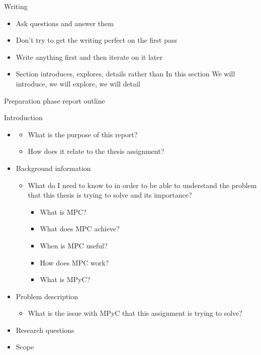 \begin{frame}{Writing}
\protect\hypertarget{writing}{}
\begin{itemize}
\item
  Ask questions and answer them
\item
  Don't try to get the writing perfect on the first pass
\item
  Write anything first and then iterate on it later
\item
  Section introduces, explores, details rather than In this section We
  will introduce, we will explore, we will detail
\end{itemize}
\end{frame}

\begin{frame}{Preparation phase report outline}
\protect\hypertarget{preparation-phase-report-outline}{}
\begin{block}{Introduction}
\protect\hypertarget{introduction}{}
\begin{itemize}
\item
  \begin{itemize}
  \tightlist
  \item
    What is the purpose of this report?
  \item
    How does it relate to the thesis assignment?
  \end{itemize}
\item
  Background information

  \begin{itemize}
  \tightlist
  \item
    What do I need to know to in order to be able to understand the
    problem that this thesis is trying to solve and its importance?

    \begin{itemize}
    \tightlist
    \item
      What is MPC?
    \item
      What does MPC achieve?
    \item
      When is MPC useful?
    \item
      How does MPC work?
    \item
      What is MPyC?
    \end{itemize}
  \end{itemize}
\item
  Problem description

  \begin{itemize}
  \tightlist
  \item
    What is the issue with MPyC that this assignment is trying to solve?
  \end{itemize}
\item
  Research questions
\item
  Scope
\end{itemize}
\end{block}


\end{frame}

